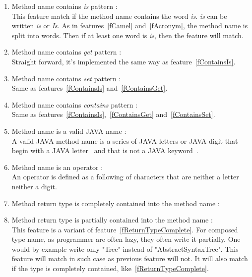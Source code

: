 \documentclass[12pt]{article}
\begin{document}
\begin{enumerate}
\item Method name contains \textit{is} pattern :\label{fContainsIs}\\
	This feature match if the method name contains the word \textit{is}. \textit{is} can be written \textit{is} or \textit{Is}. As in features~\ref{fCamel} and~\ref{fAcronym}, the method name is split into words. Then if at least one word is \textit{is}, then the feature will match. 
\item Method name contains \textit{get} pattern :\label{fContainsGet}\\
	Straight forward, it's implemented the same way as feature~\ref{fContainsIs}.
\item Method name contains \textit{set} pattern :\label{fContainsSet}\\
	Same as features~\ref{fContainsIs} and~\ref{fContainsGet}.
\item Method name contains \textit{contains} pattern :\\
	Same as features~\ref{fContainsIs},~\ref{fContainsGet} and~\ref{fContainsSet}.
\item Method name is a valid JAVA name :\\
	A valid JAVA method name is a series of JAVA letters or JAVA digit that begin with a JAVA letter~\cite{jls_ident} and that is not a JAVA keyword~\cite{jls_keyword}. %
\item Method name is an operator :\\
	An operator is defined as a following of characters that are neither a letter neither a digit.
\item Method return type is completely contained into the method name :
\item Method return type is partially contained into the method name :\label{fReturnTypeComplete}\\
	This feature is a variant of feature~\ref{fReturnTypeComplete}. For composed type name, as programmer are often lazy, they often write it partially. One would by example write only "Tree" instead of "AbstractSyntaxTree". This feature will match in such case as previous feature will not. It will also match if the type is completely contained, like~\ref{fReturnTypeComplete}.

\end{enumerate}
\end{document}
